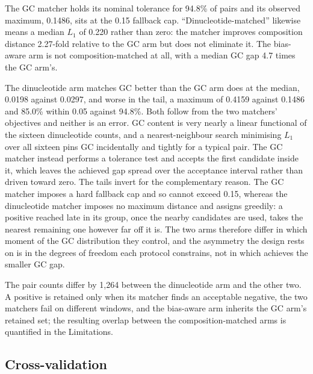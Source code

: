 The GC matcher holds its nominal tolerance for 94.8\% of pairs and its observed maximum,
0.1486, sits at the 0.15 fallback cap. ``Dinucleotide-matched'' likewise means a median $L_1$
of 0.220 rather than zero: the matcher improves composition distance 2.27-fold relative to the
GC arm but does not eliminate it. The bias-aware arm is not composition-matched at all, with a
median GC gap 4.7 times the GC arm's.

The dinucleotide arm matches GC better than the GC arm does at the median, 0.0198 against
0.0297, and worse in the tail, a maximum of 0.4159 against 0.1486 and 85.0\% within 0.05
against 94.8\%. Both follow from the two matchers' objectives and neither is an error. GC
content is very nearly a linear functional of the sixteen dinucleotide counts, and a
nearest-neighbour search minimising $L_1$ over all sixteen pins GC incidentally and tightly for
a typical pair. The GC matcher instead performs a tolerance test and accepts the first candidate
inside it, which leaves the achieved gap spread over the acceptance interval rather than driven
toward zero. The tails invert for the complementary reason. The GC matcher imposes a hard
fallback cap and so cannot exceed 0.15, whereas the dinucleotide matcher imposes no maximum
distance and assigns greedily: a positive reached late in its group, once the nearby candidates
are used, takes the nearest remaining one however far off it is. The two arms therefore differ
in which moment of the GC distribution they control, and the asymmetry the design rests on is
in the degrees of freedom each protocol constrains, not in which achieves the smaller GC gap.

The pair counts differ by 1{,}264 between the dinucleotide arm and the other two. A positive is
retained only when its matcher finds an acceptable negative, the two matchers fail on different
windows, and the bias-aware arm inherits the GC arm's retained set; the resulting overlap
between the composition-matched arms is quantified in the Limitations.

\subsection{Cross-validation}
\label{sec:cv}

